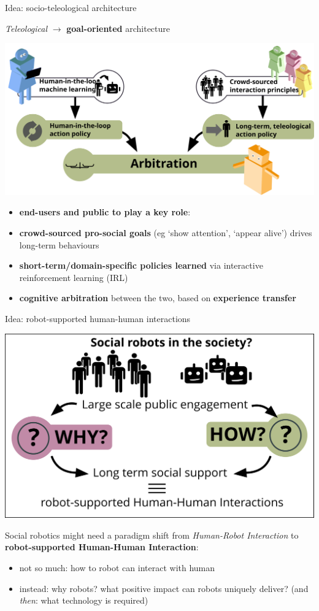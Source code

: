 \documentclass[xcolor=table]{beamer}
\begin{document}
\begin{frame}{Idea: socio-teleological architecture}

    \emph{Teleological} $\rightarrow$ \textbf{goal-oriented} architecture

    \begin{center}
        \includegraphics[width=0.8\linewidth]{architectures/arbitration}
    \end{center}

    \begin{itemize}
            \scriptsize
        \item \textbf{end-users and public to play a key role}:
        \item \textbf{crowd-sourced pro-social goals} (eg `show attention', `appear
            alive') drives long-term behaviours
        \item \textbf{short-term/domain-specific policies learned} via
            interactive reinforcement learning (IRL)
        \item \textbf{cognitive arbitration} between the two, based on
            \textbf{experience transfer}
    \end{itemize}
\end{frame}

\begin{frame}{Idea: robot-supported human-human interactions}
    \begin{center}
        \includegraphics[width=0.5\linewidth]{figs/rHHI/rHHI}
    \end{center}

    Social robotics might need a paradigm shift from \emph{Human-Robot
    Interaction} to \textbf{robot-supported
    Human-Human Interaction}:
    \begin{itemize}
        \item not so much: how to robot can interact with human
        \item instead: why robots? what positive impact can robots uniquely
            deliver? (and \emph{then}: what technology is
            required)
    \end{itemize}
\end{frame}
\end{document}
